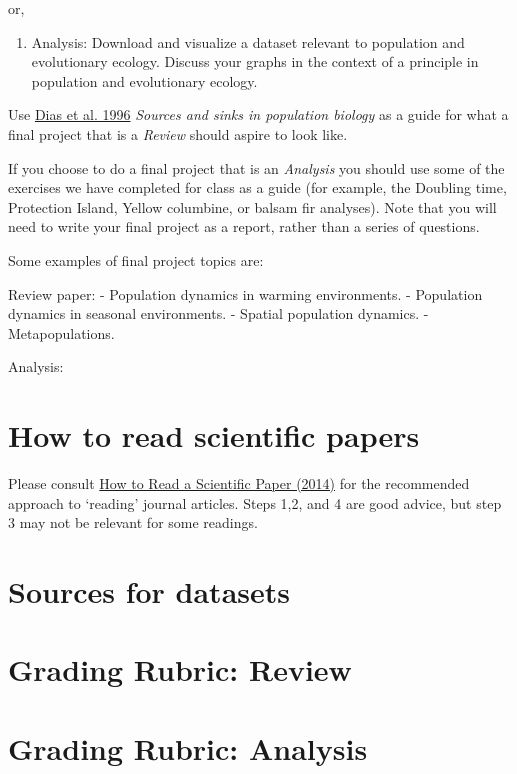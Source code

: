 \documentclass[]{book}
\providecommand{\tightlist}{%
  \setlength{\itemsep}{0pt}\setlength{\parskip}{0pt}}
\begin{document}
or,

\begin{enumerate}
\def\labelenumi{\arabic{enumi}.}
\setcounter{enumi}{1}
\tightlist
\item
  Analysis: Download and visualize a dataset relevant to population and
  evolutionary ecology. Discuss your graphs in the context of a
  principle in population and evolutionary ecology.
\end{enumerate}

Use
\href{https://www-sciencedirect-com.qe2a-proxy.mun.ca/science/article/pii/0169534796100379?via\%3Dihub}{Dias
et al. 1996} \emph{Sources and sinks in population biology} as a guide
for what a final project that is a \emph{Review} should aspire to look
like.

If you choose to do a final project that is an \emph{Analysis} you
should use some of the exercises we have completed for class as a guide
(for example, the Doubling time, Protection Island, Yellow columbine, or
balsam fir analyses). Note that you will need to write your final
project as a report, rather than a series of questions.

Some examples of final project topics are:

Review paper: - Population dynamics in warming environments. -
Population dynamics in seasonal environments. - Spatial population
dynamics. - Metapopulations.

Analysis:

\section{How to read scientific
papers}\label{how-to-read-scientific-papers}

Please consult
\href{https://www.research4life.org/blog/how-to-read-a-scientific-paper/}{How
to Read a Scientific Paper (2014)} for the recommended approach to
`reading' journal articles. Steps 1,2, and 4 are good advice, but step 3
may not be relevant for some readings.

\section{Sources for datasets}\label{sources-for-datasets}

\section{Grading Rubric: Review}\label{grading-rubric-review}

\section{Grading Rubric: Analysis}\label{grading-rubric-analysis}

\backmatter
\end{document}
